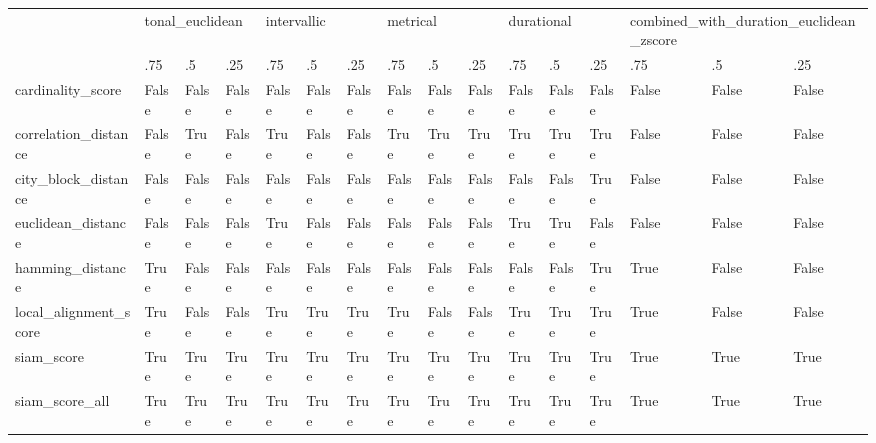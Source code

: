 \begin{tabular}{llllllllllllllll}
\toprule
{} & \multicolumn{3}{l}{tonal\_euclidean} & \multicolumn{3}{l}{intervallic} & \multicolumn{3}{l}{metrical} & \multicolumn{3}{l}{durational} & \multicolumn{3}{l}{combined\_with\_duration\_euclidean\_zscore} \\
{} & .75 & .5 & .25 & .75 & .5 & .25 & .75 & .5 & .25 & .75 & .5 & .25 & .75 & .5 & .25 \\
\midrule
cardinality\_score     & False & False & False & False & False & False & False & False & False & False & False & False & False & False & False \\
correlation\_distance  & False & True & False & True & False & False & True & True & True & True & True & True & False & False & False \\
city\_block\_distance   & False & False & False & False & False & False & False & False & False & False & False & True & False & False & False \\
euclidean\_distance    & False & False & False & True & False & False & False & False & False & True & True & False & False & False & False \\
hamming\_distance      & True & False & False & False & False & False & False & False & False & False & False & True & True & False & False \\
local\_alignment\_score & True & False & False & True & True & True & True & False & False & True & True & True & True & False & False \\
siam\_score            & True & True & True & True & True & True & True & True & True & True & True & True & True & True & True \\
siam\_score\_all        & True & True & True & True & True & True & True & True & True & True & True & True & True & True & True \\
\bottomrule
\end{tabular}


